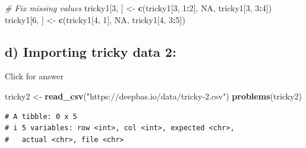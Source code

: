 \documentclass[
]{book}
\newenvironment{Shaded}{\begin{snugshade}}{\end{snugshade}}
\newcommand{\CommentTok}[1]{\textcolor[rgb]{0.56,0.35,0.01}{\textit{#1}}}
\newcommand{\ConstantTok}[1]{\textcolor[rgb]{0.56,0.35,0.01}{#1}}
\newcommand{\DecValTok}[1]{\textcolor[rgb]{0.00,0.00,0.81}{#1}}
\newcommand{\FunctionTok}[1]{\textcolor[rgb]{0.13,0.29,0.53}{\textbf{#1}}}
\newcommand{\NormalTok}[1]{#1}
\newcommand{\OtherTok}[1]{\textcolor[rgb]{0.56,0.35,0.01}{#1}}
\newcommand{\SpecialCharTok}[1]{\textcolor[rgb]{0.81,0.36,0.00}{\textbf{#1}}}
\newcommand{\StringTok}[1]{\textcolor[rgb]{0.31,0.60,0.02}{#1}}
\begin{document}
\begin{Shaded}
\begin{Highlighting}[]
\CommentTok{\# Fix missing values}
\NormalTok{tricky1[}\DecValTok{3}\NormalTok{, ] }\OtherTok{\textless{}{-}} \FunctionTok{c}\NormalTok{(tricky1[}\DecValTok{3}\NormalTok{, }\DecValTok{1}\SpecialCharTok{:}\DecValTok{2}\NormalTok{], }\ConstantTok{NA}\NormalTok{, tricky1[}\DecValTok{3}\NormalTok{, }\DecValTok{3}\SpecialCharTok{:}\DecValTok{4}\NormalTok{])}
\NormalTok{tricky1[}\DecValTok{6}\NormalTok{, ] }\OtherTok{\textless{}{-}} \FunctionTok{c}\NormalTok{(tricky1[}\DecValTok{4}\NormalTok{, }\DecValTok{1}\NormalTok{], }\ConstantTok{NA}\NormalTok{, tricky1[}\DecValTok{4}\NormalTok{, }\DecValTok{3}\SpecialCharTok{:}\DecValTok{5}\NormalTok{])}
\end{Highlighting}
\end{Shaded}

\hypertarget{d-importing-tricky-data-2}{%
\subsection{d) Importing tricky data 2:}\label{d-importing-tricky-data-2}}

Click for answer

\begin{Shaded}
\begin{Highlighting}[]
\NormalTok{tricky2 }\OtherTok{\textless{}{-}} \FunctionTok{read\_csv}\NormalTok{(}\StringTok{"https://deepbas.io/data/tricky{-}2.csv"}\NormalTok{)}
\FunctionTok{problems}\NormalTok{(tricky2)}
\end{Highlighting}
\end{Shaded}

\begin{verbatim}
# A tibble: 0 x 5
# i 5 variables: row <int>, col <int>, expected <chr>,
#   actual <chr>, file <chr>
\end{verbatim}
\end{document}
